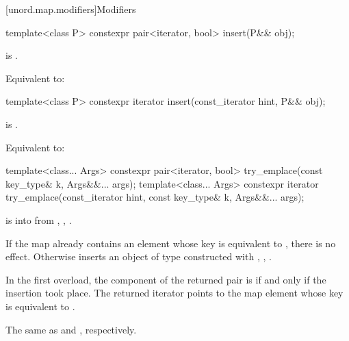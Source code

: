 [unord.map.modifiers]{Modifiers}

%
\begin{itemdecl}
template<class P>
  constexpr pair<iterator, bool> insert(P&& obj);
\end{itemdecl}

\begin{itemdescr}

\pnum
\constraints
{} is .

\pnum
\effects
Equivalent to: 
\end{itemdescr}

%
\begin{itemdecl}
template<class P>
  constexpr iterator insert(const_iterator hint, P&& obj);
\end{itemdecl}

\begin{itemdescr}
\pnum
\constraints
{} is .

\pnum
\effects
Equivalent to:
\end{itemdescr}

%
\begin{itemdecl}
template<class... Args>
  constexpr pair<iterator, bool> try_emplace(const key_type& k, Args&&... args);
template<class... Args>
  constexpr iterator try_emplace(const_iterator hint, const key_type& k, Args&&... args);
\end{itemdecl}

\begin{itemdescr}
\pnum
\expects
{} is  into 
from , ,
.

\pnum
\effects
If the map already contains an element
whose key is equivalent to ,
there is no effect.
Otherwise inserts an object of type 
constructed with , ,
.

\pnum
\returns
In the first overload,
the  component of the returned pair is 
if and only if the insertion took place.
The returned iterator points to the map element
whose key is equivalent to .

\pnum
\complexity
The same as  and ,
respectively.
\end{itemdescr}

